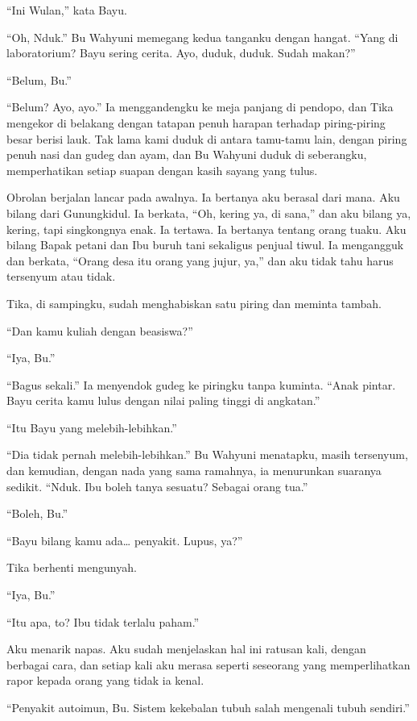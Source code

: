\documentclass[11pt,twoside,openany]{book}
\begin{document}
``Ini Wulan,'' kata Bayu.

``Oh, Nduk.'' Bu Wahyuni memegang kedua tanganku dengan hangat. ``Yang di laboratorium? Bayu sering cerita. Ayo, duduk, duduk. Sudah makan?''

``Belum, Bu.''

``Belum? Ayo, ayo.'' Ia menggandengku ke meja panjang di pendopo, dan Tika mengekor di belakang dengan tatapan penuh harapan terhadap piring-piring besar berisi lauk. Tak lama kami duduk di antara tamu-tamu lain, dengan piring penuh nasi dan gudeg dan ayam, dan Bu Wahyuni duduk di seberangku, memperhatikan setiap suapan dengan kasih sayang yang tulus.

Obrolan berjalan lancar pada awalnya. Ia bertanya aku berasal dari mana. Aku bilang dari Gunungkidul. Ia berkata, ``Oh, kering ya, di sana,'' dan aku bilang ya, kering, tapi singkongnya enak. Ia tertawa. Ia bertanya tentang orang tuaku. Aku bilang Bapak petani dan Ibu buruh tani sekaligus penjual tiwul. Ia mengangguk dan berkata, ``Orang desa itu orang yang jujur, ya,'' dan aku tidak tahu harus tersenyum atau tidak.

Tika, di sampingku, sudah menghabiskan satu piring dan meminta tambah.

``Dan kamu kuliah dengan beasiswa?''

``Iya, Bu.''

``Bagus sekali.'' Ia menyendok gudeg ke piringku tanpa kuminta. ``Anak pintar. Bayu cerita kamu lulus dengan nilai paling tinggi di angkatan.''

``Itu Bayu yang melebih-lebihkan.''

``Dia tidak pernah melebih-lebihkan.'' Bu Wahyuni menatapku, masih tersenyum, dan kemudian, dengan nada yang sama ramahnya, ia menurunkan suaranya sedikit. ``Nduk. Ibu boleh tanya sesuatu? Sebagai orang tua.''

``Boleh, Bu.''

``Bayu bilang kamu ada\ldots{} penyakit. Lupus, ya?''

Tika berhenti mengunyah.

``Iya, Bu.''

``Itu apa, to? Ibu tidak terlalu paham.''

Aku menarik napas. Aku sudah menjelaskan hal ini ratusan kali, dengan berbagai cara, dan setiap kali aku merasa seperti seseorang yang memperlihatkan rapor kepada orang yang tidak ia kenal.

``Penyakit autoimun, Bu. Sistem kekebalan tubuh salah mengenali tubuh sendiri.''
\end{document}
